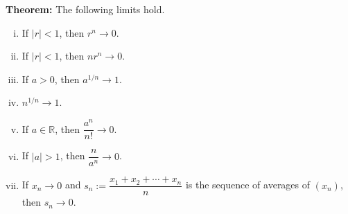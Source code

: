 \documentclass[a4paper,11pt,abstracton]{scrartcl}
\newcommand{\RR}{\mathbb{R}}
\theoremstyle{dotlessP}
\theoremstyle{dotlessS}
\theoremstyle{remark}
\theoremstyle{definition}
\begin{document}
\begin{problem_box}
\textbf{Theorem:}
The following limits hold.
\begin{enumerate}[(i)]
    \item If $|r|<1$, then $r^n\to0$.
    \item If $|r|<1$, then $nr^n\to0$.
    \item If $a>0$, then $a^{1/n}\to1$.
    \item $n^{1/n}\to1$.
    \item If $a\in\RR$, then $\dfrac{a^n}{n!}\to0$.
    \item If $|a|>1$, then $\dfrac{n}{a^n}\to0$.
    \item If $x_n\to0$ and $s_n:=\dfrac{x_1+x_2+\cdots+x_n}{n}$ is the sequence of averages of $(x_n)$, then $s_n\to0$.
\end{enumerate}
\end{problem_box}
\end{document}
